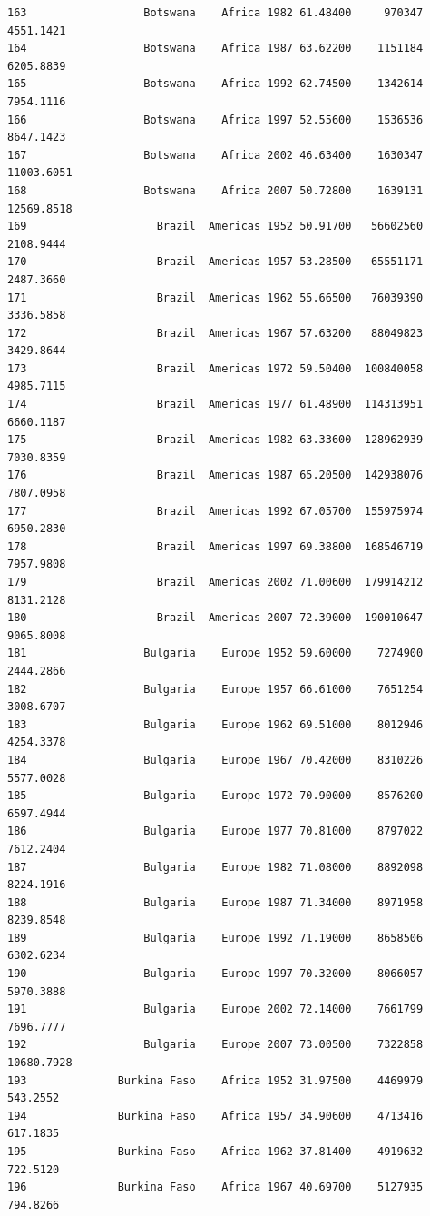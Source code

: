 \documentclass[
  letterpaper,
  DIV=11,
  numbers=noendperiod]{scrreprt}
\begin{document}
\begin{verbatim}
163                  Botswana    Africa 1982 61.48400     970347   4551.1421
164                  Botswana    Africa 1987 63.62200    1151184   6205.8839
165                  Botswana    Africa 1992 62.74500    1342614   7954.1116
166                  Botswana    Africa 1997 52.55600    1536536   8647.1423
167                  Botswana    Africa 2002 46.63400    1630347  11003.6051
168                  Botswana    Africa 2007 50.72800    1639131  12569.8518
169                    Brazil  Americas 1952 50.91700   56602560   2108.9444
170                    Brazil  Americas 1957 53.28500   65551171   2487.3660
171                    Brazil  Americas 1962 55.66500   76039390   3336.5858
172                    Brazil  Americas 1967 57.63200   88049823   3429.8644
173                    Brazil  Americas 1972 59.50400  100840058   4985.7115
174                    Brazil  Americas 1977 61.48900  114313951   6660.1187
175                    Brazil  Americas 1982 63.33600  128962939   7030.8359
176                    Brazil  Americas 1987 65.20500  142938076   7807.0958
177                    Brazil  Americas 1992 67.05700  155975974   6950.2830
178                    Brazil  Americas 1997 69.38800  168546719   7957.9808
179                    Brazil  Americas 2002 71.00600  179914212   8131.2128
180                    Brazil  Americas 2007 72.39000  190010647   9065.8008
181                  Bulgaria    Europe 1952 59.60000    7274900   2444.2866
182                  Bulgaria    Europe 1957 66.61000    7651254   3008.6707
183                  Bulgaria    Europe 1962 69.51000    8012946   4254.3378
184                  Bulgaria    Europe 1967 70.42000    8310226   5577.0028
185                  Bulgaria    Europe 1972 70.90000    8576200   6597.4944
186                  Bulgaria    Europe 1977 70.81000    8797022   7612.2404
187                  Bulgaria    Europe 1982 71.08000    8892098   8224.1916
188                  Bulgaria    Europe 1987 71.34000    8971958   8239.8548
189                  Bulgaria    Europe 1992 71.19000    8658506   6302.6234
190                  Bulgaria    Europe 1997 70.32000    8066057   5970.3888
191                  Bulgaria    Europe 2002 72.14000    7661799   7696.7777
192                  Bulgaria    Europe 2007 73.00500    7322858  10680.7928
193              Burkina Faso    Africa 1952 31.97500    4469979    543.2552
194              Burkina Faso    Africa 1957 34.90600    4713416    617.1835
195              Burkina Faso    Africa 1962 37.81400    4919632    722.5120
196              Burkina Faso    Africa 1967 40.69700    5127935    794.8266

\end{verbatim}
\end{document}
